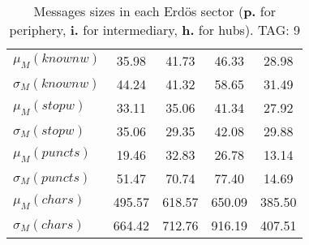 \begin{table}[h!]
\begin{center}
\begin{tabular}{| l || c | c | c | c |}
$\mu_M(knownw)$ & 35.98  & 41.73  & 46.33  & 28.98 \\
$\sigma_M(knownw)$ & 44.24  & 41.32  & 58.65  & 31.49 \\\hline
$\mu_M(stopw)$ & 33.11  & 35.06  & 41.34  & 27.92 \\
$\sigma_M(stopw)$ & 35.06  & 29.35  & 42.08  & 29.88 \\\hline
$\mu_M(puncts)$ & 19.46  & 32.83  & 26.78  & 13.14 \\
$\sigma_M(puncts)$ & 51.47  & 70.74  & 77.40  & 14.69 \\\hline
$\mu_M(chars)$ & 495.57  & 618.57  & 650.09  & 385.50 \\
$\sigma_M(chars)$ & 664.42  & 712.76  & 916.19  & 407.51 \\\hline
\end{tabular}
\caption{Messages sizes in each Erd\"os sector ({{\bf p.}} for periphery, {{\bf i.}} for intermediary, {{\bf h.}} for hubs). TAG: 9}
\end{center}
\end{table}